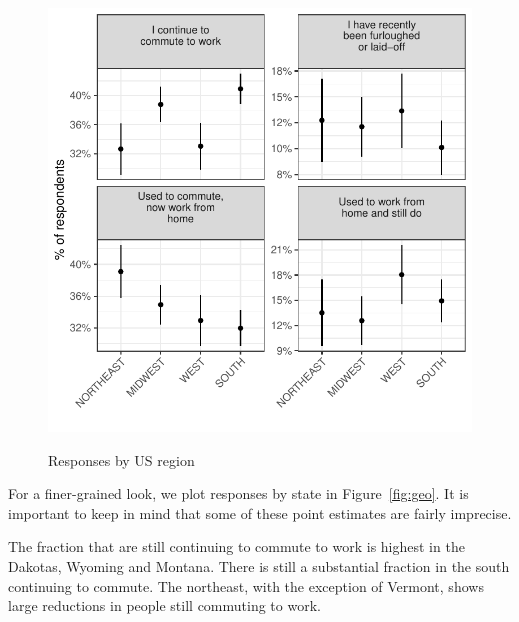 \documentclass[12pt]{article}
\begin{document}
\begin{figure}
  \caption{Responses by US region} \label{fig:region}
\centering
\begin{minipage}{1.0 \linewidth}
  \includegraphics[width = \linewidth]{plots/region.pdf} \\
  \begin{footnotesize}
    \end{footnotesize}
\end{minipage}
\end{figure} 

For a finer-grained look, we plot responses by state in Figure~\ref{fig:geo}.
It is important to keep in mind that some of these point estimates are fairly imprecise.

The fraction that are still continuing to commute to work is highest in the Dakotas, Wyoming and Montana.
There is still a substantial fraction in the south continuing to commute. 
The northeast, with the exception of Vermont, shows large reductions in people still commuting to work. 
\end{document}
